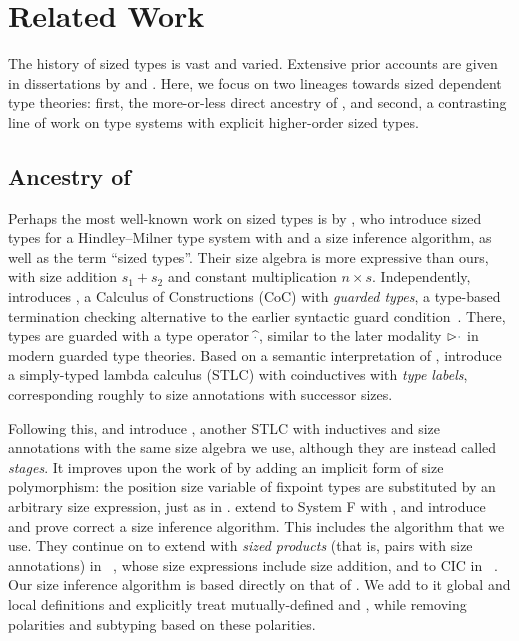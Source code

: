 \section{Related Work}\label{sec:related}

The history of sized types is vast and varied.
Extensive prior accounts are given in dissertations by \citet{lambda-hat-diss} and \citet{abel-diss}.
Here, we focus on two lineages towards sized dependent type theories: first, the more-or-less direct ancestry of \lang, and second, a contrasting line of work on type systems with explicit higher-order sized types.

\subsection{Ancestry of \titlelang}\label{sec:ancestry}

Perhaps the most well-known work on sized types is by \citet{hughes},
who introduce sized types for a Hindley--Milner type system with \coinductives and a size inference algorithm,
as well as the term ``sized types''.
Their size algebra is more expressive than ours, with size addition $s_1 + s_2$ and constant multiplication $n \times s$.
Independently, \citet{ccr} introduces \CCR, a Calculus of Constructions (CoC) with \textit{guarded types},
a type-based termination checking alternative to the earlier syntactic guard condition~\citep{guard-condition}.
There, types are guarded with a type operator $\widehat{\ph}$,
similar to the later modality $\rhd \ph$ in modern guarded type theories.
Based on a semantic interpretation of \CCR,
\citet{acg} introduce a simply-typed lambda calculus (STLC) with coinductives with \textit{type labels},
corresponding roughly to size annotations with successor sizes.

Following this, \citet{lambda-hat} and \citet{lambda-hat-diss} introduce \lambdahat,
another STLC with inductives and size annotations with the same size algebra we use,
although they are instead called \textit{stages}.
It improves upon the work of \citet{acg} by adding an implicit form of size polymorphism:
the position size variable of fixpoint types are substituted by an arbitrary size expression,
just as in .
\citet{f-hat} extend \lambdahat to System F with \Fhat, and introduce and prove correct a size inference algorithm.
This includes the \RecCheck algorithm that we use.
They continue on to extend \Fhat with \textit{sized products} (that is, pairs with size annotations) in \FXhat~\citep{fx-hat}, whose size expressions include size addition, and to CIC in \CIChat~\citep{cic-hat}.
Our size inference algorithm is based directly on that of \CIChat.
We add to it global and local definitions and explicitly treat mutually-defined \coinductives and \cofixpoints,
while removing polarities and subtyping based on these polarities.

